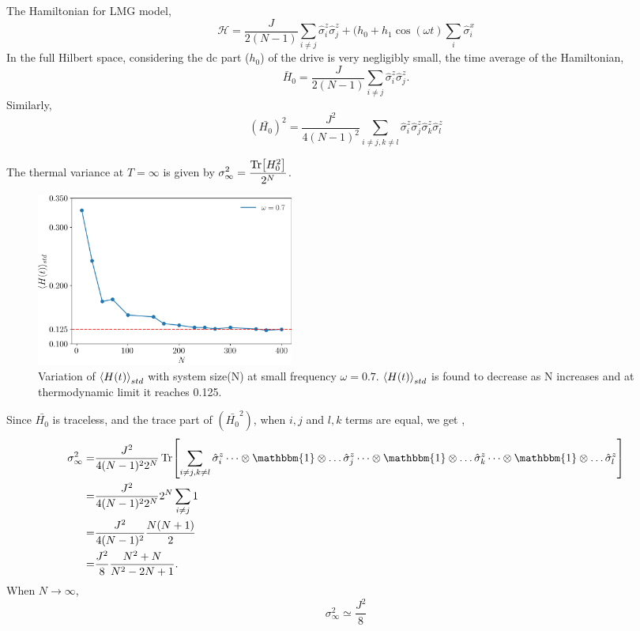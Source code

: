\documentclass[aps,prb,reprint,showpacs,floatfix,superscriptaddress, onecolumn, nofootinbib, 9pt]{revtex4-2}
\begin{document}
\begin{enumerate}
{	
The Hamiltonian for LMG model,
\begin{equation}
	\mathcal{H} = \frac{J}{2(N-1)}\sum_{i\neq j}\hat{\sigma}^z_i \hat{\sigma}^z_j + (h_0 +h_1 \cos(\omega t) \sum_i \hat{\sigma}^x_i
\end{equation}
In the full Hilbert space, considering the dc part ($h_0$) of the drive is very negligibly small, the time average of the Hamiltonian,
\begin{equation*}
	\bar{H}_0 = \frac{J}{2(N-1)}\sum_{i\neq j}\hat{\sigma}^z_i \hat{\sigma}^z_j.
\end{equation*}
Similarly,
\begin{equation}
	\left(\bar{H_0}\right)^2 = \frac{J^2}{4(N-1)^2}\sum_{i\neq j, k \neq l} \hat{\sigma}^z_i \hat{\sigma}^z_j \hat{\sigma}^z_k \hat{\sigma}^z_l
\end{equation}

The thermal variance at $T= \infty$ is given by $\displaystyle \sigma^2_{\infty} = \frac{\Tr[H^2_0]}{2^N}$. 

\begin{figure}[h!]
	\includegraphics[width=8.5cm]{hbar_avg_std_w0.7.jpg}
	\caption{Variation of $\expval{H(t)}_{std}$ with system size(N) at small frequency $\omega=0.7$. $\expval{H(t)}_{std}$ is found to decrease as N increases and at thermodynamic limit it reaches 0.125.}
	\label{fig:std_N}
\end{figure}

Since $\bar{H_0}$ is traceless, and the trace part of $\left(\bar{H_0}^2\right)$, when $i,j$ and $l,k$ terms are equal, we get ,
\begin{align*}
	\sigma_\infty^2 =& \frac{J^2}{4(N-1)^2 2^N}\Tr[\sum_{i\neq j, k \neq l} \hat{\sigma}^z_i \dots\otimes \mathbbm{1} \otimes \dots \hat{\sigma}^z_j \dots\otimes \mathbbm{1} \otimes \dots \hat{\sigma}^z_k\dots\otimes \mathbbm{1} \otimes \dots \hat{\sigma}^z_l ]\\
	=& \frac{J^2}{4(N-1)^2 2^N}   2^N \sum_{i\neq j} 1\\
	=& \frac{J^2}{4(N-1)^2} \frac{N(N+1)}{2}\\
	=& \frac{J^2}{8} \frac{N^2+N}{N^2-2N+1}.
\end{align*}
When $N\rightarrow \infty$,
\begin{equation}
	\sigma_\infty^2 \simeq \frac{J^2}{8}
	\label{eq:std_inf}
\end{equation} 

}
\end{enumerate}
\end{document}
